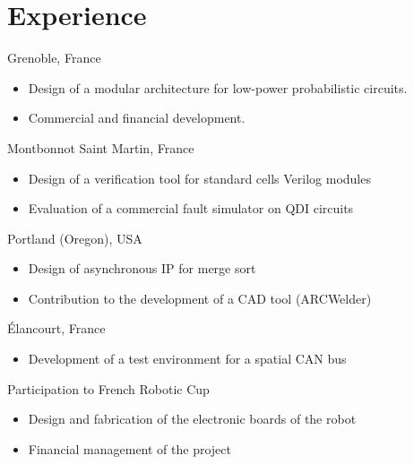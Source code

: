 \documentclass[11pt, a4paper]{moderncv}
\begin{document}
\section{Experience}
%
        {Grenoble, France}{}{%
          \begin{itemize}
          \item Design of a modular architecture for low-power probabilistic circuits.
          \item Commercial and financial development.
          \end{itemize}
        }
%
        {Montbonnot Saint Martin, France}{}{%
          \begin{itemize}
          \item Design of a verification tool for standard cells Verilog modules
          \item Evaluation of a commercial fault simulator on QDI circuits
          \end{itemize}
        }
%
        {Portland (Oregon), USA}{}{%
          \begin{itemize}
          \item Design of asynchronous IP for merge sort
          \item Contribution to the development of a CAD tool (ARCWelder)
          \end{itemize}
        }
%
        {{\'E}lancourt, France}{}{%
          \begin{itemize}
          \item Development of a test environment for a spatial CAN bus
          \end{itemize}
        }
%
        {}{}{%
          Participation to French Robotic Cup
          \begin{itemize}
          \item Design and fabrication of the electronic boards of the robot
          \item Financial management of the project
          \end{itemize}
        }
\end{document}
